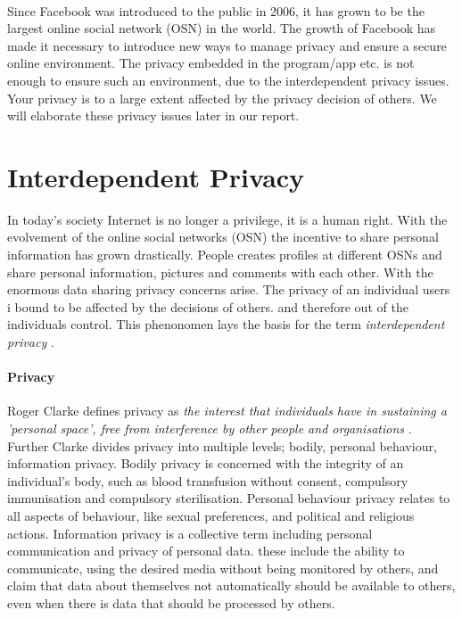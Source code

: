 \paragraph{}
Since Facebook was introduced to the public in 2006, it has grown to be the largest online social network (OSN) in the world. The growth of Facebook has made it necessary to introduce new ways to manage privacy and ensure a secure online environment. The privacy embedded in the program/app etc. is not enough to ensure such an environment, due to the interdependent privacy issues. Your privacy is to a large extent affected by the privacy decision of others. We will elaborate these privacy issues later in our report. 


\section{Interdependent Privacy}
In today's society Internet is no longer a privilege, it is a human right. With the evolvement of the online social networks (OSN) the incentive to share personal information has grown drastically. People creates profiles at different OSNs and share personal information, pictures and comments with each other. With the enormous data sharing privacy concerns arise. The privacy of an individual users i bound to be affected by the decisions of others. and therefore out of the individuals control. This phenonomen lays the basis for the term \textit{interdependent privacy} \cite{InterdependetPriv}. 

\paragraph{Privacy}
Roger Clarke defines privacy as \textit{the interest that individuals have in sustaining a 'personal space', free from interference by other people and organisations} \cite{privacy}. Further Clarke divides privacy into multiple levels; bodily, personal behaviour, information privacy. Bodily privacy is concerned with the integrity of an individual's body, such as blood transfusion without consent, compulsory immunisation and compulsory sterilisation. Personal behaviour privacy relates to all aspects of behaviour, like sexual preferences, and political and religious actions. Information privacy is a collective term including personal communication and privacy of personal data. these include the ability to communicate, using the desired media without being monitored by others, and claim that data about themselves not automatically should be available to others, even when there is data that should be processed by others.

